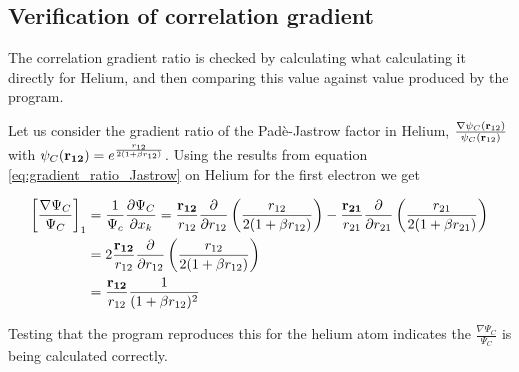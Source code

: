 		\subsection{Verification of correlation gradient}
			The correlation gradient ratio is checked by calculating what calculating it directly for Helium, and then comparing this value against value produced by the program.

			Let us consider the gradient ratio of the Padè-Jastrow factor in Helium, \(\frac{\nabla\psi_C(\vb{r}_{12})}{\psi_C(\vb{r}_{12})}\) with \(\psi_C(\vb{r_{12}}) = e^{\frac{r_{12}}{2(1+\beta r_{12})}}\). Using the results from equation \eqref{eq:gradient_ratio_Jastrow} on Helium for the first electron we get

			\begin{align}
				\left[\frac{\nabla\Psi_C}{\Psi_C} \right]_1 &= \frac{1}{\Psi_c} \pdv{\Psi_C}{x_k} = \frac{\vb{r_{12}}}{r_{12}}\pdv{}{r_{12}}\left( \frac{r_{12}}{2(1+\beta r_{12})} \right) - \frac{\vb{r_{21}}}{r_{21}}\pdv{}{r_{21}}\left( \frac{r_{21}}{2(1+\beta r_{21})} \right)
				\\
				&= 2\frac{\vb{r_{12}}}{r_{12}}\pdv{}{r_{12}}\left( \frac{r_{12}}{2(1+\beta r_{12})} \right)
				\\
				&= \frac{\vb{r_{12}}}{r_{12}} \frac{1}{(1+\beta r_{12})^2}
			\end{align}

			Testing that the program reproduces this for the helium atom indicates the \(\frac{\nabla \Psi_C}{\Psi_C}\) is being calculated correctly.



